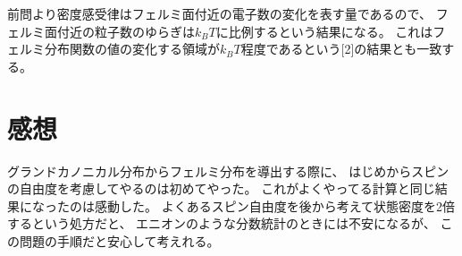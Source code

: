 \documentclass[../ap_2011.tex]{subfiles}
\begin{document}
前問より密度感受律はフェルミ面付近の電子数の変化を表す量であるので、
フェルミ面付近の粒子数のゆらぎは\(k_BT\)に比例するという結果になる。
これはフェルミ分布関数の値の変化する領域が\(k_BT\)程度であるという[2]の結果とも一致する。


\section*{感想}
グランドカノニカル分布からフェルミ分布を導出する際に、
はじめからスピンの自由度を考慮してやるのは初めてやった。
これがよくやってる計算と同じ結果になったのは感動した。
よくあるスピン自由度を後から考えて状態密度を2倍するという処方だと、
エニオンのような分数統計のときには不安になるが、
この問題の手順だと安心して考えれる。
\end{document}
